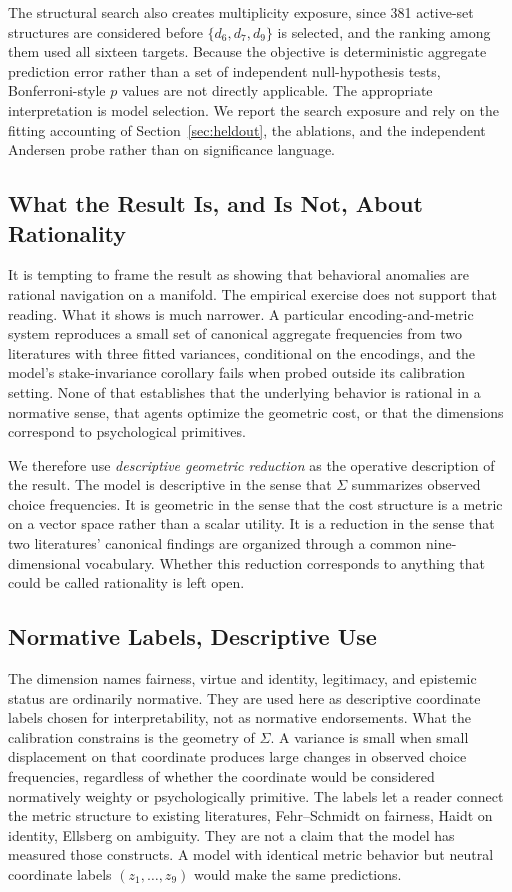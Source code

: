 \documentclass[journal]{IEEEtran}
\begin{document}
The structural search also creates multiplicity exposure, since 381 active-set structures are considered before $\{d_6,d_7,d_9\}$ is selected, and the ranking among them used all sixteen targets.
Because the objective is deterministic aggregate prediction error rather than a set of independent null-hypothesis tests, Bonferroni-style $p$ values are not directly applicable.
The appropriate interpretation is model selection.
We report the search exposure and rely on the fitting accounting of Section~\ref{sec:heldout}, the ablations, and the independent Andersen probe rather than on significance language.

\subsection{What the Result Is, and Is Not, About Rationality}
\label{sec:not-rationality}

It is tempting to frame the result as showing that behavioral anomalies are rational navigation on a manifold.
The empirical exercise does not support that reading.
What it shows is much narrower.
A particular encoding-and-metric system reproduces a small set of canonical aggregate frequencies from two literatures with three fitted variances, conditional on the encodings, and the model's stake-invariance corollary fails when probed outside its calibration setting.
None of that establishes that the underlying behavior is rational in a normative sense, that agents optimize the geometric cost, or that the dimensions correspond to psychological primitives.

We therefore use \emph{descriptive geometric reduction} as the operative description of the result.
The model is descriptive in the sense that $\Sigma$ summarizes observed choice frequencies.
It is geometric in the sense that the cost structure is a metric on a vector space rather than a scalar utility.
It is a reduction in the sense that two literatures' canonical findings are organized through a common nine-dimensional vocabulary.
Whether this reduction corresponds to anything that could be called rationality is left open.

\subsection{Normative Labels, Descriptive Use}
\label{sec:descriptive-labels}

The dimension names fairness, virtue and identity, legitimacy, and epistemic status are ordinarily normative.
They are used here as descriptive coordinate labels chosen for interpretability, not as normative endorsements.
What the calibration constrains is the geometry of $\Sigma$.
A variance is small when small displacement on that coordinate produces large changes in observed choice frequencies, regardless of whether the coordinate would be considered normatively weighty or psychologically primitive.
The labels let a reader connect the metric structure to existing literatures, Fehr--Schmidt on fairness, Haidt on identity, Ellsberg on ambiguity.
They are not a claim that the model has measured those constructs.
A model with identical metric behavior but neutral coordinate labels $(z_1,\dots,z_9)$ would make the same predictions.
\end{document}
